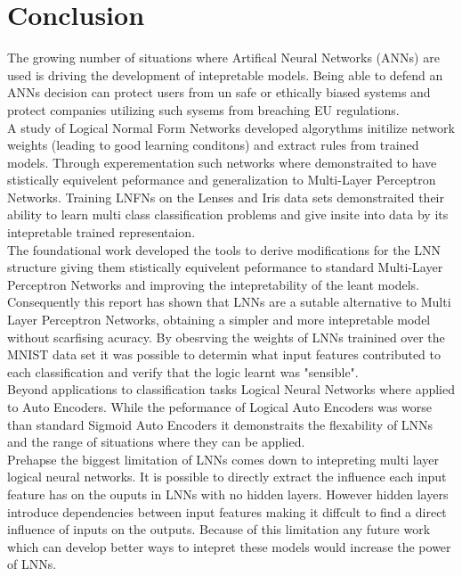 \chapter{Conclusion}\label{C:con}
The growing number of situations where Artifical Neural Networks (ANNs) are used is driving the development of intepretable models. Being able to defend an ANNs decision can protect users from un safe or ethically biased systems and protect companies utilizing such sysems from breaching EU regulations.\\

A study of Logical Normal Form Networks developed algorythms initilize network weights (leading to good learning conditons) and extract rules from trained models. Through experementation such networks where demonstraited to have stistically equivelent peformance and generalization to Multi-Layer Perceptron Networks. Training LNFNs on the Lenses and Iris data sets demonstraited their ability to learn multi class classification problems and give insite into data by its intepretable trained representaion.\\

The foundational work developed the tools to derive modifications for the LNN structure giving them stistically equivelent peformance to standard Multi-Layer Perceptron Networks and improving the intepretability of the leant models. Consequently this report has shown that LNNs are a sutable alternative to Multi Layer Perceptron Networks, obtaining a simpler and more intepretable model without scarfising acuracy. By obesrving the weights of LNNs trainined over the MNIST data set it was possible to determin what input features contributed to each classification and verify that the logic learnt was "sensible".\\

Beyond applications to classification tasks Logical Neural Networks where applied to Auto Encoders. While the peformance of Logical Auto Encoders was worse than standard Sigmoid Auto Encoders it demonstraits the flexability of LNNs and the range of situations where they can be applied.\\

Prehapse the biggest limitation of LNNs comes down to intepreting multi layer logical neural networks. It is possible to directly extract the influence each input feature has on the ouputs in LNNs with no hidden layers. However hidden layers introduce dependencies between input features making it diffcult to find a direct influence of inputs on the outputs. Because of this limitation any future work which can develop better ways to intepret these models would increase the power of LNNs.\\

